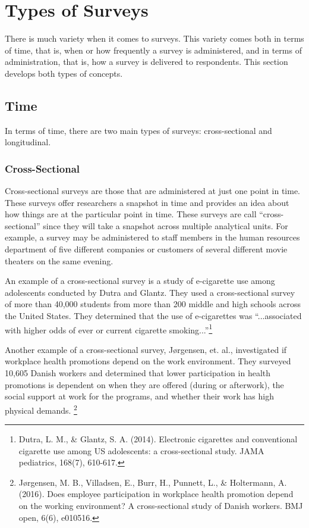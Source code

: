 \section{Types of Surveys}

There is much variety when it comes to surveys. This variety comes both in terms of time, that is, when or how frequently a survey is administered, and in terms of administration, that is, how a survey is delivered to respondents. This section develops both types of concepts.

\subsection{Time}

In terms of time, there are two main types of surveys: cross-sectional and longitudinal.

\subsubsection{Cross-Sectional}

Cross-sectional surveys are those that are administered at just one point in time. These surveys offer researchers a snapshot in time and provides an idea about how things are at the particular point in time. These surveys are call ``cross-sectional'' since they will take a snapshot across multiple analytical units. For example, a survey may be administered to staff members in the human resources department of five different companies or customers of several different movie theaters on the same evening. 

An example of a cross-sectional survey is a study of e-cigarette use among adolescents conducted by Dutra and Glantz. They used a cross-sectional survey of more than 40,000 students from more than 200 middle and high schools across the United States. They determined that the use of e-cigarettes was ``...associated with higher odds of ever or current cigarette smoking...''\footnote{Dutra, L. M., \& Glantz, S. A. (2014). Electronic cigarettes and conventional cigarette use among US adolescents: a cross-sectional study. JAMA pediatrics, 168(7), 610-617.}

Another example of a cross-sectional survey, J\o{}rgensen, et. al., investigated if workplace health promotions depend on the work environment. They surveyed 10,605 Danish workers and determined that lower participation in health promotions is dependent on when they are offered (during or afterwork), the social support at work for the programs, and whether their work has high physical demands. \footnote{J\o{}rgensen, M. B., Villadsen, E., Burr, H., Punnett, L., \& Holtermann, A. (2016). Does employee participation in workplace health promotion depend on the working environment? A cross-sectional study of Danish workers. BMJ open, 6(6), e010516.}

